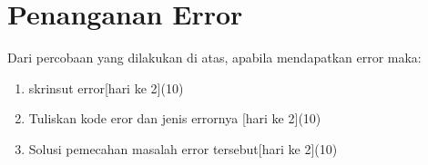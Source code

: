 \section{Penanganan Error}
Dari percobaan yang dilakukan di atas, apabila mendapatkan error maka:

\begin{enumerate}
	\item
	skrinsut error[hari ke 2](10)
	\item
Tuliskan kode eror dan jenis errornya [hari ke 2](10)
	\item
Solusi pemecahan masalah error tersebut[hari ke 2](10)

\end{enumerate}



